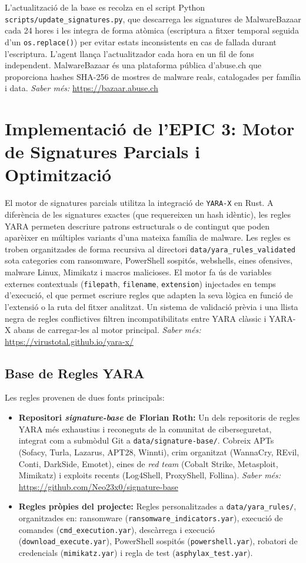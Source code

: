 \documentclass[12pt,a4paper]{report}
\begin{document}
L'actualització de la base es recolza en el script Python \texttt{scripts/update\_signatures.py}, que descarrega les signatures de MalwareBazaar cada 24 hores i les integra de forma atòmica (escriptura a fitxer temporal seguida d'un \texttt{os.replace()}) per evitar estats inconsistents en cas de fallada durant l'escriptura. L'agent llança l'actualitzador cada hora en un fil de fons independent. MalwareBazaar és una plataforma pública d'abuse.ch que proporciona hashes SHA-256 de mostres de malware reals, catalogades per família i data. \textit{Saber més:} \url{https://bazaar.abuse.ch}

\section{Implementació de l'EPIC 3: Motor de Signatures Parcials i Optimització}
El motor de signatures parcials utilitza la integració de \texttt{YARA-X} en Rust. A diferència de les signatures exactes (que requereixen un hash idèntic), les regles YARA permeten descriure patrons estructurals o de contingut que poden aparèixer en múltiples variants d'una mateixa família de malware. Les regles es troben organitzades de forma recursiva al directori \texttt{data/yara\_rules\_validated} sota categories com ransomware, PowerShell sospitós, webshells, eines ofensives, malware Linux, Mimikatz i macros malicioses. El motor fa ús de variables externes contextuals (\texttt{filepath}, \texttt{filename}, \texttt{extension}) injectades en temps d'execució, el que permet escriure regles que adapten la seva lògica en funció de l'extensió o la ruta del fitxer analitzat. Un sistema de validació prèvia i una llista negra de regles conflictives filtren incompatibilitats entre YARA clàssic i YARA-X abans de carregar-les al motor principal. \textit{Saber més:} \url{https://virustotal.github.io/yara-x/}

\subsection{Base de Regles YARA}
Les regles provenen de dues fonts principals:
\begin{itemize}
    \item \textbf{Repositori \textit{signature-base} de Florian Roth:} Un dels repositoris de regles YARA més exhaustius i reconeguts de la comunitat de ciberseguretat, integrat com a submòdul Git a \texttt{data/signature-base/}. Cobreix APTs (Sofacy, Turla, Lazarus, APT28, Winnti), crim organitzat (WannaCry, REvil, Conti, DarkSide, Emotet), eines de \textit{red team} (Cobalt Strike, Metasploit, Mimikatz) i exploits recents (Log4Shell, ProxyShell, Follina). \textit{Saber més:} \url{https://github.com/Neo23x0/signature-base}
    \item \textbf{Regles pròpies del projecte:} Regles personalitzades a \texttt{data/yara\_rules/}, organitzades en: ransomware (\texttt{ransomware\_indicators.yar}), execució de comandes (\texttt{cmd\_execution.yar}), descàrrega i execució (\texttt{download\_execute.yar}), PowerShell sospitós (\texttt{powershell.yar}), robatori de credencials (\texttt{mimikatz.yar}) i regla de test (\texttt{asphylax\_test.yar}).
\end{itemize}
\end{document}
